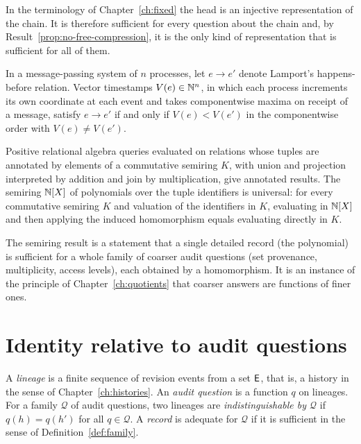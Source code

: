 In the terminology of Chapter~\ref{ch:fixed} the head is an injective representation of the chain. It is therefore sufficient for every question about the chain and, by Result~\ref{prop:no-free-compression}, it is the only kind of representation that is sufficient for all of them.

\begin{established}\label{prop:vector-clocks}
In a message-passing system of $n$ processes, let $e\to e'$ denote Lamport's happens-before relation. Vector timestamps $V(e)\in\mathbb{N}^{n}$, in which each process increments its own coordinate at each event and takes componentwise maxima on receipt of a message, satisfy $e\to e'$ if and only if $V(e)<V(e')$ in the componentwise order with $V(e)\ne V(e')$.
\end{established}

\begin{established}\label{prop:semirings}
Positive relational algebra queries evaluated on relations whose tuples are annotated by elements of a commutative semiring $K$, with union and projection interpreted by addition and join by multiplication, give annotated results. The semiring $\mathbb{N}[X]$ of polynomials over the tuple identifiers is universal: for every commutative semiring $K$ and valuation of the identifiers in $K$, evaluating in $\mathbb{N}[X]$ and then applying the induced homomorphism equals evaluating directly in $K$.
\end{established}

The semiring result is a statement that a single detailed record (the polynomial) is sufficient for a whole family of coarser audit questions (set provenance, multiplicity, access levels), each obtained by a homomorphism. It is an instance of the principle of Chapter~\ref{ch:quotients} that coarser answers are functions of finer ones.

\section{Identity relative to audit questions}

\begin{definition}\label{def:lineage-identity}
A \emph{lineage} is a finite sequence of revision events from a set $\mathsf{E}$, that is, a history in the sense of Chapter~\ref{ch:histories}. An \emph{audit question} is a function $q$ on lineages. For a family $\mathcal Q$ of audit questions, two lineages are \emph{indistinguishable by $\mathcal Q$} if $q(h)=q(h')$ for all $q\in\mathcal Q$. A \emph{record} is adequate for $\mathcal Q$ if it is sufficient in the sense of Definition~\ref{def:family}.
\end{definition}


